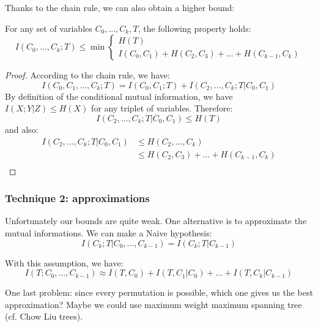 Thanks to the chain rule, we can also obtain a higher bound:

\begin{lemma}
    For any set of variables $C_0, \ldots, C_k, T$, the following property holds:
    \[ 
    I(C_0, \ldots, C_k; T) \leq \min
    \begin{cases}
        H(T)\\
        I(C_0, C_1) + H(C_2, C_3) + \ldots + H(C_{k-1}, C_k)
    \end{cases}
   \] 
\end{lemma}

\begin{proof}
According to the chain rule, we have: 
$$
I(C_0, C_1, \ldots, C_k;T) = I(C_0, C_1 ; T) + I(C_2,\ldots,C_k ; T | C_0, C_1)
$$
By definition of the conditional mutual information, we have $I(X;Y|Z) \leq
H(X)$ for any triplet of variables. Therefore:
\[
    I(C_2,\ldots,C_k ; T | C_0, C_1) \leq H(T)
\]and also:
\[
    \begin{split}
        I(C_2,\ldots,C_k ; T | C_0, C_1) & \leq H(C_2,\ldots,C_k)\\
        & \leq H(C_2, C_3) + \ldots + H(C_{k-1},C_k)\\
    \end{split}
\]
\end{proof}

\subsubsection{Technique 2: approximations}

Unfortunately our bounds are quite weak. One alternative is to
approximate the mutual informations. We can make a Naive hypothesis:
\[
    I(C_k ; T | C_0, \ldots, C_{k-1}) = I(C_k ; T | C_{k-1})
\]

With this assumption, we have:
\[
    I(T ; C_0, \ldots, C_{k-1}) \approx I(T, C_0) + I(T, C_1 | C_0)+ \ldots +  I(T, C_k | C_{k-1})
\]

One last problem: since every permutation is possible, which one gives us the
best approximation?  Maybe we could use maximum weight
maximum spanning tree (cf. Chow Liu trees).
